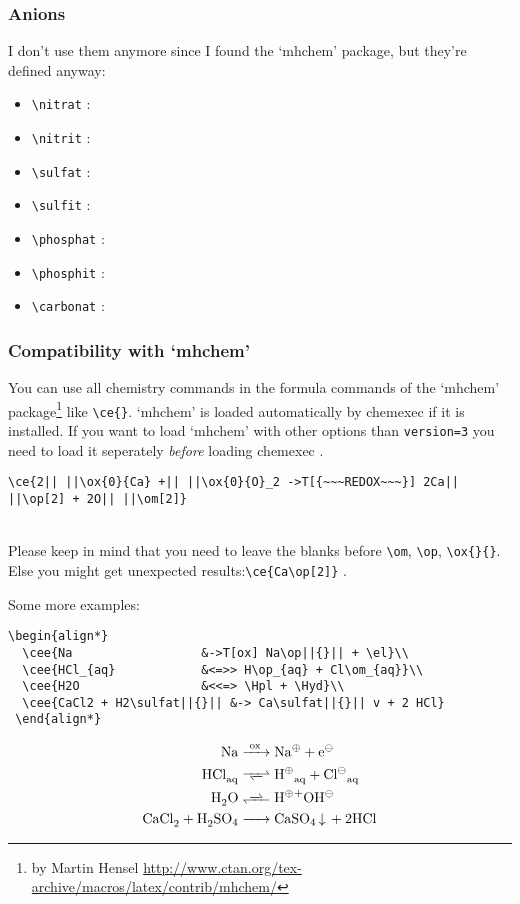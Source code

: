 \documentclass[DIV10]{scrartcl}
\newcommand{\CEx}[1][8]{%
{\color{dunkelrot}\fontfamily{pag}\fontsize{#1}{#1}\selectfont chemexec}\xspace
}
\begin{document}
\subsubsection{Anions}
I don't use them anymore since I found the `mhchem' package, but they're defined anyway:
\begin{itemize}
 \item \verb=\nitrat= : \nitrat
 \item \verb=\nitrit= : \nitrit
 \item \verb=\sulfat= : \sulfat
 \item \verb=\sulfit= : \sulfit
 \item \verb=\phosphat= : \phosphat
 \item \verb=\phosphit= : \phosphit
 \item \verb=\carbonat= : \carbonat
\end{itemize}

\subsubsection{Compatibility with `mhchem'}
You can use all chemistry commands in the formula commands of the `mhchem' package\footnote{by Martin Hensel \url{http://www.ctan.org/tex-archive/macros/latex/contrib/mhchem/}} like \verb=\ce{}=. `mhchem' is loaded automatically by \CEx if it is installed. If you want to load `mhchem' with other options than \verb+version=3+ you need to load it seperately \emph{before} loading \CEx.
\begin{lstlisting}[numbers=none,basicstyle=\normalsize\ttfamily,showspaces=true]
 \ce{2|| ||\ox{0}{Ca} +|| ||\ox{0}{O}_2 ->T[{~~~REDOX~~~}] 2Ca|| ||\op[2] + 2O|| ||\om[2]}
\end{lstlisting}
\\
Please keep in mind that you need to leave the blanks before \verb=\om=, \verb=\op=, \verb=\ox{}{}=. Else you might get unexpected results:\verb=\ce{Ca\op[2]}=  .

\noindent Some more examples:
\begin{lstlisting}[numbers=none,basicstyle=\normalsize\ttfamily]
 \begin{align*}
  \cee{Na                  &->T[ox] Na\op||{}|| + \el}\\
  \cee{HCl_{aq}            &<=>> H\op_{aq} + Cl\om_{aq}}\\
  \cee{H2O                 &<<=> \Hpl + \Hyd}\\
  \cee{CaCl2 + H2\sulfat||{}|| &-> Ca\sulfat||{}|| v + 2 HCl}
 \end{align*}
\end{lstlisting}
\begin{align*}
 \cee{Na                  &->T[ox] Na\op{} + \el}\\
 \cee{HCl_{aq}            &<=>> H\op_{aq} + Cl\om_{aq}}\\
 \cee{H2O                 &<<=> \Hpl + \Hyd}\\
 \cee{CaCl2 + H2\sulfat{} &-> Ca\sulfat{} v + 2 HCl}
\end{align*}
\end{document}
